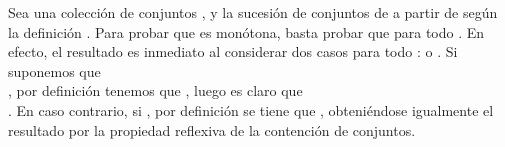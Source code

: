 \begin{isabellebody}
\begin{isamarkuptext}
  \begin{demostracion}
    Sea una colección de conjuntos ,  y  la sucesión de conjuntos de  a partir de 
     según la definición . Para probar que  es monótona, basta probar que  
    para todo . En efecto, el resultado es inmediato al considerar dos casos para todo 
    :  o . Si suponemos que\\ , por definición 
    tenemos que , luego es claro que\\ . En caso contrario, si 
    , por definición se tiene que , obteniéndose igualmente el resultado
    por la propiedad reflexiva de la contención de conjuntos. 
  \end{demostracion}


\end{isamarkuptext}
\end{isabellebody}
